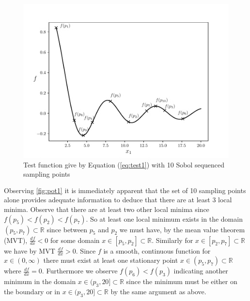\begin{figure} [H] 
\centerline{\includegraphics[scale=0.8]{./Fig1.pdf}}
{\caption{Test function give by Equation (\ref{eq:test1}) with 10 Sobol sequenced sampling points} \label{fig:pot1}}
\end{figure}

Observing \autoref{fig:pot1} it is immediately apparent that the set of 10 sampling points alone provides adequate information to deduce that there are at least 3 local minima. Observe that there are at least two other local minima since $ f(p_5) < f(p_2) < f(p_7)$. So at least one local minimum exists in the domain $(p_5, p_7) \subset \mathbb{R}$ since between $p_5$ and $p_2$ we must have, by the mean value theorem (MVT), $\frac{df}{dx} < 0$ for some domain $x \in [p_5, p_2] \subset \mathbb{R}$. Similarly for $x \in [p_2, p_7] \subset \mathbb{R}$ we have by MVT $\frac{df}{dx} > 0$. Since $f$ is a smooth, continuous function for $x \in (0, \infty)$ there must exist at least one stationary point $x  \in (p_5, p_7)  \subset \mathbb{R}$ where $\frac{df}{dx} = 0$. Furthermore we observe $f(p_6) < f(p_3)$ indicating another minimum in the domain $x  \in (p_3, 20] \subset \mathbb{R}$ since the minimum must be either on the boundary or in $x  \in (p_3, 20] \subset \mathbb{R}$ by the same argument as above. %

